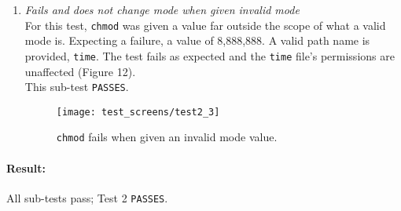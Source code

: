 \documentclass[11pt,letterpaper]{report}
\begin{document}
\begin{enumerate}
		\item \emph{Fails and does not change mode when given invalid mode}\\
		For this test, {\tt chmod} was given a value far outside the scope of what a valid mode is. Expecting a failure, a value of 8,888,888. A valid path name is provided, {\tt time}. The test fails as expected and the {\tt time} file's permissions are unaffected ({\color{red}Figure 12}).\\
		This sub-test {\tt PASSES}.
		
		\begin{figure}
			\centering
			\texttt{[image: test\_screens/test2\_3]}
			\caption{{\tt chmod} fails when given an invalid mode value.}
			\label{fig:test23}
		\end{figure}
	
	\end{enumerate}

	\paragraph{Result:} All sub-tests pass; Test 2 {\tt PASSES}.\\
	
	
\end{document}
